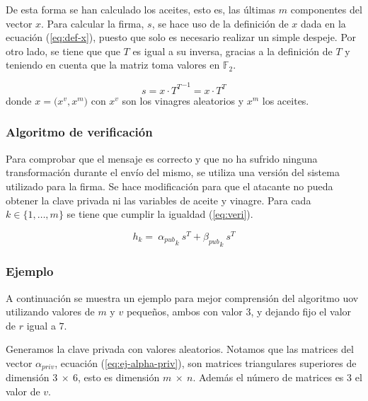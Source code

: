 De esta forma se han calculado los aceites, esto es, las últimas $m$ componentes del vector $x$. Para calcular la firma, $s$, se hace uso de la definición de $x$  dada en la ecuación (\ref{eq:def-x}), puesto que solo es necesario realizar un simple despeje. Por otro lado, se tiene que  que $T$ es igual a su inversa, gracias a la definición de $T$ y teniendo en cuenta que la matriz toma valores en $\mathds{F}_2$.

\begin{equation}\label{eq:firma}
	s = x \cdot {T^{\scriptscriptstyle T}}^{-1} = x \cdot T ^{\scriptscriptstyle T}
\end{equation}
donde $x = \big(x^v, x^m\big)$ con $x^v$ son los vinagres aleatorios y $x^m$ los aceites.




\subsubsection{Algoritmo de verificación}

Para comprobar que el mensaje es correcto y que no ha sufrido ninguna transformación durante el envío del mismo, se utiliza una versión del sistema utilizado para la firma. Se hace modificación para que el atacante no pueda obtener la clave privada ni las variables de aceite y vinagre. Para cada $k \in  \{1,\dots, m\}$ se tiene que cumplir la igualdad (\ref{eq:veri}).


\begin{equation}\label{eq:veri}
	h_k = \ {\alpha_{pub}}_k \ s^{\scriptscriptstyle T} + {\beta_{pub}}_{k} \ s^{\scriptscriptstyle T}
\end{equation}

\subsubsection{Ejemplo}

A continuación se muestra un ejemplo para mejor comprensión del algoritmo \acrshort{uov} utilizando valores de $m$ y $v$ pequeños, ambos con valor $3$, y dejando fijo el valor de $r$ igual a $7$.

Generamos la clave privada con valores aleatorios. Notamos que las matrices del vector $\alpha_{priv}$, ecuación (\ref{eq:ej-alpha-priv}), son matrices triangulares superiores de dimensión $3\ \times\ 6$, esto es dimensión $m\ \times\ n$. Además el número de matrices es $3$ el valor de $v$.

